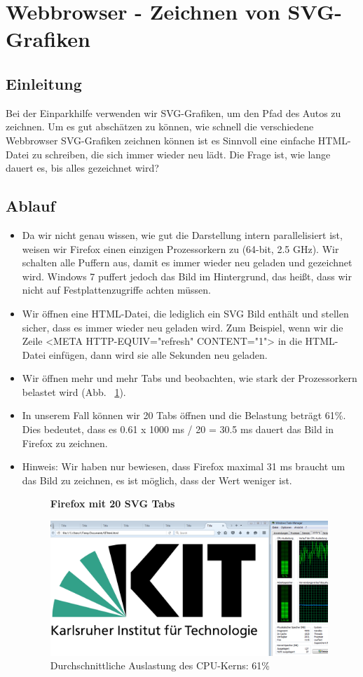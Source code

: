 \documentclass[qualitaetssicherung.tex]{subfiles}
\begin{document}
\section{Webbrowser - Zeichnen von SVG-Grafiken}
	\subsection{Einleitung}
	Bei der Einparkhilfe verwenden wir SVG-Grafiken, um den Pfad des Autos zu zeichnen. Um es gut abschätzen zu können, wie schnell die verschiedene Webbrowser SVG-Grafiken zeichnen können ist es Sinnvoll eine einfache HTML-Datei zu schreiben, die sich immer wieder neu lädt. Die Frage ist, wie lange dauert es, bis alles gezeichnet wird?
	\subsection{Ablauf}
	\begin{itemize}
	\item Da wir nicht genau wissen, wie gut die Darstellung intern parallelisiert ist, weisen wir Firefox einen einzigen Prozessorkern zu (64-bit, 2.5 GHz). Wir schalten alle Puffern aus, damit es immer wieder neu geladen und gezeichnet wird. Windows 7 puffert jedoch das Bild im Hintergrund, das heißt, dass wir nicht auf Festplattenzugriffe achten müssen.
	\item Wir öffnen eine HTML-Datei, die lediglich ein SVG Bild enthält und stellen sicher, dass es immer wieder neu geladen wird. Zum Beispiel, wenn wir die Zeile <META HTTP-EQUIV="refresh" CONTENT="1"> in die HTML-Datei einfügen, dann wird sie alle Sekunden neu geladen.
	\item Wir öffnen mehr und mehr Tabs und beobachten, wie stark der Prozessorkern belastet wird (Abb. ~\ref{firefox_svg}).
	\item In unserem Fall können wir 20 Tabs öffnen und die Belastung beträgt 61\%. Dies bedeutet, dass es 0.61 x 1000 ms / 20 = 30.5 ms dauert das Bild in Firefox zu zeichnen.
	\item Hinweis: Wir haben nur bewiesen, dass Firefox maximal 31 ms braucht um das Bild zu zeichnen, es ist möglich, dass der Wert weniger ist.
	
	\begin{figure}[H]
    \textbf{Firefox mit 20 SVG Tabs}\par\medskip
    \includegraphics[width=0.99\textwidth]{Images/firefox-svg.png}
    \caption{Durchschnittliche Auslastung des CPU-Kerns: 61\%}
		\label{firefox_svg}
	\end{figure}
	\end{itemize}
	
\end{document}
